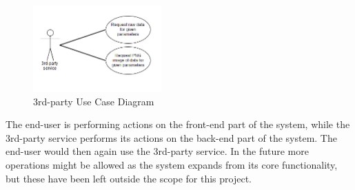 \documentclass[11pt,a4paper,titlepage,oneside]{report}
\begin{document}
  \begin{figure}[h]
	\begin{center}
	\includegraphics[height=125px,width=186px]{img/useCase_3rdParty.png}
	\caption{3rd-party Use Case Diagram}
	\label{fig:3rdPartyUseDiagram}
	\small
	\end{center}
  \end{figure}

    The end-user is performing actions on the \gls{front-end} part of the system, while the 3rd-party service performs its actions on the \gls{back-end} part of the system. The end-user would then again use the 3rd-party service. In the future more operations might be allowed as the system expands from its core functionality, but these have been left outside the scope for this project.
\end{document}
